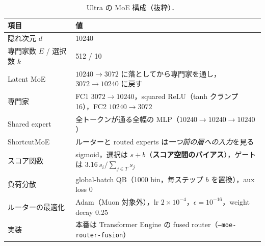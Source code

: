 \documentclass[a4paper,11pt]{ltjsarticle}
\theoremstyle{definition}
\theoremstyle{plain}
\begin{document}
\begin{table}[h]
\centering\small
\begin{tabular}{@{}ll@{}}
\toprule
項目 & 値 \\ \midrule
隠れ次元 $d$ & 10240 \\
専門家数 $E$ / 選択数 $k$ & 512 / 10 \\
Latent MoE & $10240\to3072$ に落としてから専門家を通し，$3072\to10240$ に戻す \\
専門家 & FC1 $3072\to10240$，squared ReLU（tanh クランプ 16），FC2 $10240\to3072$ \\
Shared expert & 全トークンが通る全幅の MLP（$10240\to10240\to10240$） \\
ShortcutMoE & ルーターと routed experts は\emph{一つ前の層への入力}を見る \\
スコア関数 & sigmoid，選択は $s+b$（\textbf{スコア空間のバイアス}），ゲートは $3.16\,s_i/\sum_{j\in T}s_j$ \\
負荷分散 & global-batch QB（1000 bin，毎ステップ $b$ を置換），aux loss 0 \\
ルーターの最適化 & Adam（Muon 対象外），lr $2\times10^{-4}$，$\epsilon=10^{-16}$，weight decay 0.25 \\
実装 & 本番は Transformer Engine の fused router（\texttt{--moe-router-fusion}） \\
\bottomrule
\end{tabular}
\caption{Ultra の MoE 構成（抜粋）．}
\label{tab:config}
\end{table}
\end{document}

